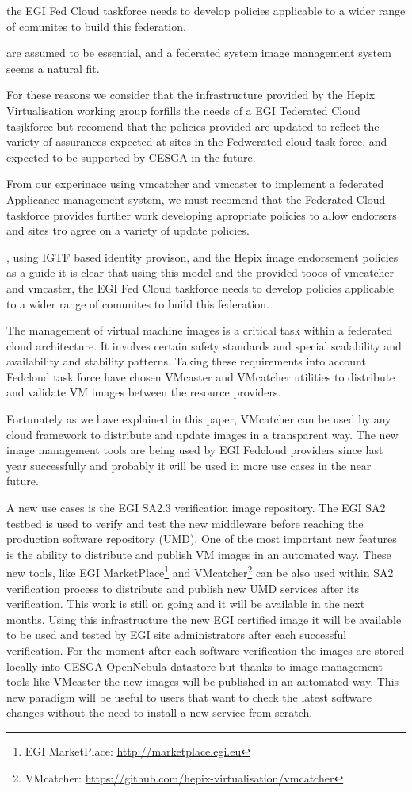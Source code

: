 \documentclass{llncs_Ibergrid2013}
\begin{document}
the EGI Fed Cloud taskforce needs to develop policies applicable to a wider range of comunites to build this federation.

are assumed to be essential, and a federated system image management system seems a natural fit. 


For these reasons we consider that the infrastructure provided by the Hepix Virtualisation working group forfills the needs of a EGI Tederated Cloud tasjkforce but recomend that the policies provided are updated to reflect the variety of assurances expected at sites in the Fedwerated cloud task force, and expected to be supported by CESGA in the future.

From our experinace using vmcatcher and vmcaster to implement a federated Applicance management system, we must recomend that the Federated Cloud taskforce provides further work developing apropriate policies to allow endorsers and sites tro agree on a variety of update policies.


, using IGTF based identity provison, and the Hepix image endorsement policies as a guide it is clear that using this model and the provided tooos of vmcatcher and vmcaster, the EGI Fed Cloud taskforce needs to develop policies applicable to a wider range of comunites to build this federation.


The management of virtual machine images is a critical task within a federated cloud architecture. It involves certain safety standards and special scalability and availability and stability patterns.
Taking these requirements into account Fedcloud task force have chosen VMcaster and VMcatcher utilities to distribute and validate VM images between the resource providers.

Fortunately as we have explained in this paper, VMcatcher can be used by any cloud framework to distribute and update images in a transparent way. 
The new image management tools are being used by EGI Fedcloud providers since last year successfully and probably it will be used in more use cases in the near future.

A new use cases is the EGI SA2.3 verification image repository. The EGI SA2 testbed is used to verify and test the new middleware before reaching the production software repository (UMD).
One of the most important new features is the ability to distribute and publish VM images in an automated way. 
These new tools, like EGI MarketPlace\footnote{EGI MarketPlace: \url{http://marketplace.egi.eu}} and VMcatcher\footnote{VMcatcher: \url{https://github.com/hepix-virtualisation/vmcatcher}} can be also used within SA2 verification process to distribute and publish new UMD services after its verification. 
This work is still on going and it will be available in the next months. Using this infrastructure the new EGI certified image it will be available to be used and tested by EGI site administrators after each successful verification.
For the moment after each software verification the images are stored locally into CESGA OpenNebula datastore but thanks to image management tools like VMcaster the new images will be published in an automated way.
This new paradigm will be useful to users that want to check the latest software changes without the need to install a new service from scratch.
\end{document}
